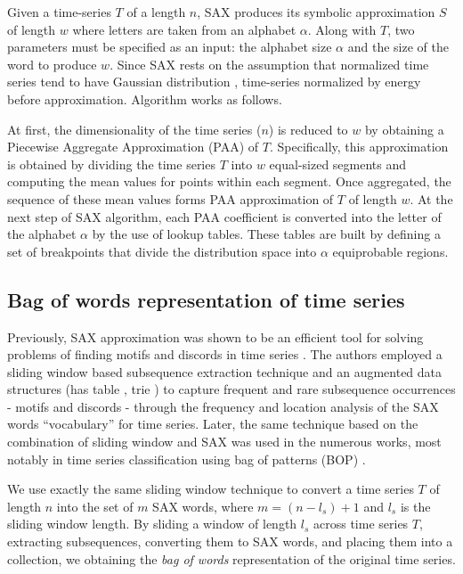 \documentclass{llncs}
\begin{document}
Given a time-series $T$ of a length $n$, SAX produces its symbolic approximation $S$ of length $w$
where letters are taken from an alphabet $\alpha$. 
Along with $T$, two parameters must be specified as an input: the alphabet size $\alpha$ and the 
size of the word to produce $w$. Since SAX rests on the assumption that normalized time series 
tend to have Gaussian distribution \cite{larsen_marx}, time-series normalized by energy 
\cite{goldin_kanellakis} before approximation. Algorithm works as follows. 

At first, the dimensionality of the time series ($n$) is reduced to $w$ by obtaining a 
Piecewise Aggregate Approximation (PAA) of $T$. Specifically, this approximation is 
obtained by dividing the time series $T$ into $w$ equal-sized segments and computing the 
mean values for points within each segment. Once aggregated, the sequence of these mean 
values forms PAA approximation of $T$ of length $w$. At the next step of SAX algorithm, 
each PAA coefficient is converted into the letter of the alphabet $\alpha$ by the use of 
lookup tables. These tables are built by defining a set of breakpoints that divide the 
distribution space into $\alpha$ equiprobable regions.

\subsection{Bag of words representation of time series}
Previously, SAX approximation was shown to be an efficient tool for solving problems 
of finding motifs and discords in time series \cite{motifs} \cite{hot_sax}. 
The authors employed a sliding window based subsequence extraction technique 
and an augmented data structures (has table \cite{motifs}, trie \cite{hot_sax}) 
to capture frequent and rare subsequence occurrences - motifs and discords - 
through the frequency and location analysis of the SAX words 
``vocabulary'' for time series. 
Later, the same technique based on the combination of sliding window and SAX
was used in the numerous works, most notably in time series classification using 
bag of patterns (BOP) \cite{bag_patterns}. 

We use exactly the same sliding window technique to convert a time series $T$ of 
length $n$ into the set of $m$ SAX words, where $m=(n-l_{s})+1$ and 
$l_{s}$ is the sliding window length. 
By sliding a window of length $l_{s}$ across time series $T$, extracting 
subsequences, converting them to SAX words, and placing them into a collection,
we obtaining the \textit{bag of words} representation of the original time series.
\end{document}
